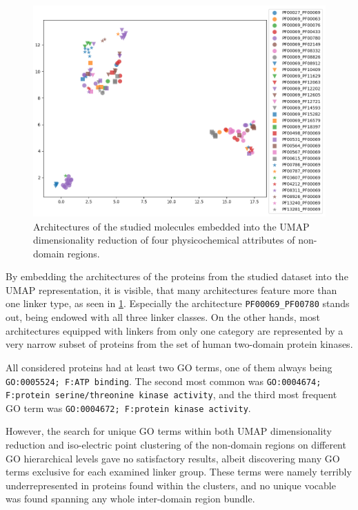		\begin{figure}
			\centering
			\includegraphics[width=0.9\linewidth]{img/linker_umap_arch.png}
			\caption{Architectures of the studied molecules embedded into the UMAP
			dimensionality reduction of four physicochemical attributes of non-domain regions.}
			\label{fig:umap_arch}
		\end{figure}

		By embedding the architectures of the proteins from the studied dataset into the UMAP
		representation, it is visible, that many architectures feature more than one linker
		type, as seen in \cref{fig:umap_arch}.
		Especially the architecture \texttt{PF00069\_PF00780} stands out, being endowed with
		all three linker classes.
		On the other hands, most architectures equipped with linkers from only one category
		are represented by a very narrow subset of proteins from the set of human two-domain
		protein kinases.

	\label{res:first:go}

		All considered proteins had at least two GO terms, one of them always being
		\texttt{GO:0005524; F:ATP binding}.
		The second most common was \texttt{GO:0004674; F:protein serine/threonine kinase
		activity}, and the third most frequent GO term was \texttt{GO:0004672; F:protein
		kinase activity}.

		However, the search for unique GO terms within both UMAP dimensionality reduction and
		iso-electric point clustering of the non-domain regions on different GO hierarchical
		levels gave no satisfactory results, albeit discovering many GO terms exclusive for
		each examined linker group.
		These terms were namely terribly underrepresented in proteins found within the
		clusters, and no unique vocable was found spanning any whole inter-domain region
		bundle.

